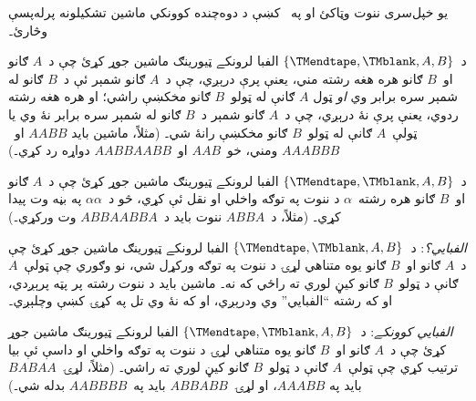 \documentclass[../../../include/open-logic-section]{subfiles}
\begin{document}
\begin{prob}
يو خپل‌سری ننوت وټاکئ او په~ کښې
د دوه‌چنده کوونکي ماشين تشکيلونه پرله‌پسې وڅارئ۔
\end{prob}

\begin{prob}
د~$\{\TMendtape,\TMblank, A, B\}$ الفبا لرونکے ټيورينګ ماشين جوړ
کړئ چې د~$A$ ګانو او~$B$ ګانو هره هغه رشته مني، يعنې پرې درېږي، چې
د~$A$ ګانو شمېر ئې د~$B$ ګانو له شمېر سره برابر وي \emph{او} ټول
$A$ ګانې له ټولو~$B$ ګانو مخکښې راشي؛ او هره هغه رشته ردوي، يعنې
پرې نۀ درېږي، چې د~$A$ ګانو شمېر د~$B$ ګانو له شمېر سره برابر نۀ وي
يا ټولې~$A$ ګانې له ټولو~$B$ ګانو مخکښې رانۀ شي۔ (مثلاً، ماشين بايد
$AABB$ او~$AAABBB$ ومني، خو~$AAB$ او~$AABBAABB$ دواړه رد کړي۔)
\end{prob}

\begin{prob}
د~$\{\TMendtape,\TMblank, A, B\}$ الفبا لرونکے ټيورينګ ماشين جوړ
کړئ چې د~$A$ ګانو او~$B$ ګانو هره رشته~$\alpha$ د ننوت په توګه
واخلي او نقل ئې کړي، څو د~$\alpha\alpha$ په بڼه وت پيدا کړي۔ (مثلاً،
د~$ABBA$ ننوت بايد د~$ABBAABBA$ وت ورکړي۔)
\end{prob}

\begin{prob}
\emph{الفبايي؟}: د~$\{\TMendtape,\TMblank, A, B\}$ الفبا لرونکے
ټيورينګ ماشين جوړ کړئ چې د~$A$ ګانو او~$B$ ګانو يوه متناهي لړۍ د
ننوت په توګه ورکړل شي، نو وګوري چې ټولې~$A$ ګانې د ټولو~$B$ ګانو
کيڼ لوري ته راځي که نه۔ ماشين بايد د ننوت رشته پر پټه پرېږدي، او که
رشته ``الفبايي'' وي ودرېږي، او که نۀ وي تل په کړۍ کښې وچلېږي۔
\end{prob}

\begin{prob}
\emph{الفبايي کوونکے}: د~$\{\TMendtape,\TMblank, A, B\}$ الفبا
لرونکے ټيورينګ ماشين جوړ کړئ چې د~$A$ ګانو او~$B$ ګانو يوه متناهي
لړۍ د ننوت په توګه واخلي او داسې ئې بيا ترتيب کړي چې ټولې~$A$ ګانې
د ټولو~$B$ ګانو کيڼ لوري ته راشي۔ (مثلاً، لړۍ~$BABAA$ بايد په
$AAABB$، او لړۍ~$ABBABB$ بايد په~$AABBBB$ بدله شي۔)
\end{prob}
\end{document}
